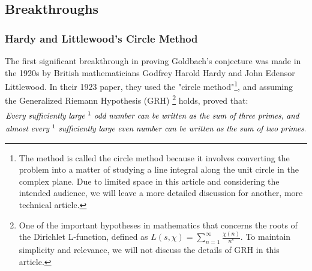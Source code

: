 \documentclass{article}
\begin{document}
\subsection*{Breakthroughs}
\subsubsection*{Hardy and Littlewood's Circle Method}
The first significant breakthrough in proving Goldbach's conjecture was made in the 1920s by British mathematicians Godfrey Harold Hardy and John Edensor Littlewood. In their 1923 paper, they used the "circle method"\footnote{The method is called the circle method because it involves converting the problem into a matter of studying a line integral along the unit circle in the complex plane. Due to limited space in this article and considering the intended audience, we will leave a more detailed discussion for another, more technical article.}, and assuming the Generalized Riemann Hypothesis (GRH) \footnote{One of the important hypotheses in mathematics that concerns the roots of the Dirichlet L-function, defined as $L(s, \chi) = \sum_{n=1}^{\infty} \frac{\chi(n)}{n^s}.$ To maintain simplicity and relevance, we will not discuss the details of GRH in this article.} holds, proved that\cite{hardy}:
\begin{equation}
    \begin{aligned}
        &\emph{Every sufficiently large \footnotemark{} odd number can be written as the sum of three primes, and}\\
        &\emph{almost every \footnotemark[\value{footnote}] sufficiently large even number can be written as the sum of two primes.}
    \end{aligned}
\end{equation} 
\end{document}
